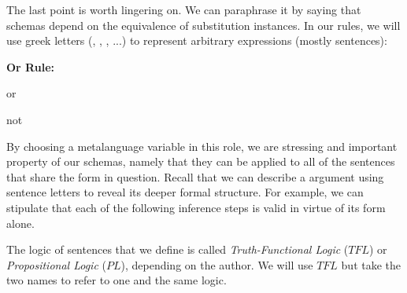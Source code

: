 The last point is worth lingering on. We can paraphrase it by saying that
schemas depend on the equivalence of substitution instances. In our rules, we
will use greek letters (\ephi, \epsi, \echi, ...) to represent arbitrary
expressions (mostly sentences):

 {
  \begin{argument}
  \item[ ] \textbf{Or Rule:}
  \item[ ] \ephi or\epsi
  \item[ ] not\ephi
  \item[\therefore] \epsi
  \end{argument}
}

By choosing a metalanguage variable in this role, we are stressing and important
property of our schemas, namely that they can be applied to all of the sentences
that share the form in question. Recall that we can describe a argument using
sentence letters to reveal its deeper formal structure. For example, we can
stipulate that each of the following inference steps is valid in virtue of its
form alone. \\


The logic of sentences that we define is called \emph{Truth-Functional Logic}
($TFL$) or \emph{Propositional Logic} ($PL$), depending on the author. We will
use $TFL$ but take the two names to refer to one and the same logic.

